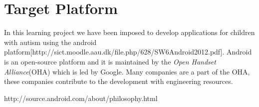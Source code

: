 \section{Target Platform}
In this learning project we have been imposed to develop applications for children with autism using the android platform[http://sict.moodle.aau.dk/file.php/628/SW6Android2012.pdf]. Android is an open-source platform and it is maintained by the \textit{Open Handset Alliance}(OHA) which is led by Google. Many companies are a part of the OHA, these companies contribute to the development with engineering resources. 

http://source.android.com/about/philosophy.html